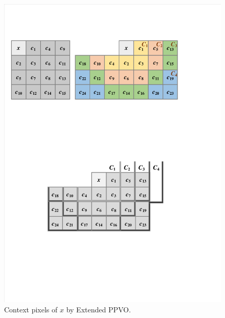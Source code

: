 \documentclass[review,3p,10pt,sort&compress]{elsarticle}
\begin{document}
\begin{figure}
    \begin{minipage}[t]{0.46\linewidth}
    \centering
    \includegraphics[width=1\textwidth]{figures/ExtendedPPVOContext.pdf}
    \end{minipage}
\centering
\caption{Context pixels of $x$ by Extended PPVO.}
\label{Fig.Context}
\end{figure}
\end{document}
